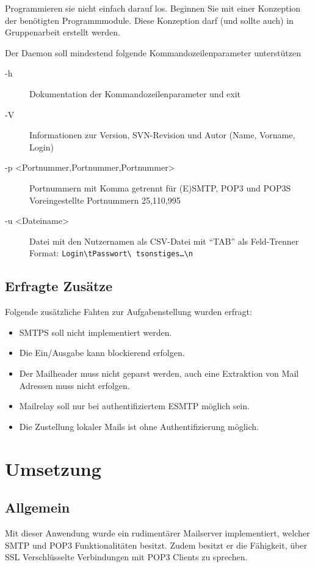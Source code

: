 \documentclass[final,a4paper,11pt,notitlepage,halfparskip]{scrreprt}
\begin{document}
Programmieren sie nicht einfach darauf los. Beginnen Sie mit einer Konzeption 
der benötigten Programmmodule. Diese Konzeption darf (und sollte auch) in 
Gruppenarbeit erstellt werden.

Der Daemon soll mindestend folgende Kommandozeilenparameter unterstützen
\begin{description}
  \item[-h] Dokumentation der Kommandozeilenparameter und exit
  \item[-V] Informationen zur Version, SVN-Revision und Autor (Name, Vorname, Login)
  \item[-p <Portnummer,Portnummer,Portnummer>] Portnummern mit Komma getrennt
            für (E)SMTP, POP3 und POP3S\\ 
            Voreingestellte Portnummern 25,110,995
  \item[-u <Dateiname>] Datei mit den Nutzernamen als CSV-Datei mit "`TAB"' als 
            Feld-Trenner\\ 
	    Format: \texttt{Login\textbackslash tPasswort\textbackslash
	    tsonstiges\dots\textbackslash n}
\end{description} 

\section{Erfragte Zusätze}
Folgende zusätzliche Fahten zur Aufgabenstellung wurden erfragt:
\begin{itemize}
  \item SMTPS soll nicht implementiert werden.
  \item Die Ein/Ausgabe kann blockierend erfolgen.
  \item Der Mailheader muss nicht geparst werden, auch eine Extraktion von
        Mail Adressen muss nicht erfolgen.
  \item Mailrelay soll nur bei authentifiziertem ESMTP möglich sein.
  \item Die Zustellung lokaler Mails ist ohne Authentifizierung möglich. 
\end{itemize}



\chapter{Umsetzung}
\section{Allgemein}\label{sec:umsetzung-allgemein}
Mit dieser Anwendung wurde ein rudimentärer Mailserver implementiert, welcher
SMTP und POP3 Funktionalitäten besitzt. Zudem besitzt er die Fähigkeit, über SSL
Verschlüsselte Verbindungen mit POP3 Clients zu sprechen.
\end{document}
